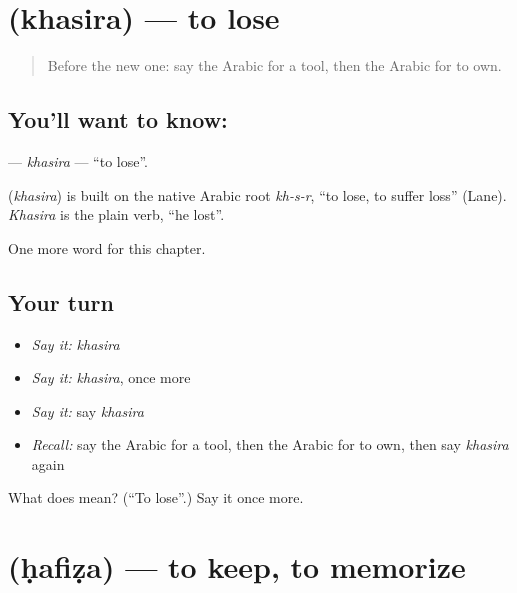 \section[\texorpdfstring{\ar{خسر} (khasira)}{خسر (khasira)}]{ (khasira) — to lose}

\label{lesson:AR-C110-khasira}



\begin{quote}
Before the new one: say the Arabic for a tool, then the Arabic for to own.
\end{quote}

\subsection*{You'll want to know: }
\textbf{} — \emph{khasira} — \textquotedblleft{}to lose\textquotedblright{}.

\begin{cousinweb}
\textbf{} (\emph{khasira}) is built on the native Arabic root \emph{kh-s-r}, \textquotedblleft{}to lose, to suffer loss\textquotedblright{} (Lane). \emph{Khasira} is the plain verb, \textquotedblleft{}he lost\textquotedblright{}.
\end{cousinweb}

\begin{grammarlens}[title={What you've built}]
One more word for this chapter.
\end{grammarlens}

\subsection*{Your turn}
\begin{itemize}
\raggedright
  \item \emph{Say it:} \emph{khasira}
  \item \emph{Say it:} \emph{khasira}, once more
  \item \emph{Say it:} say \emph{khasira}
  \item \emph{Recall:} say the Arabic for a tool, then the Arabic for to own, then say \emph{khasira} again
\end{itemize}

\begin{tcolorbox}[breakable,colback=teal!4,colframe=teal!35!black,title={Before you move on}]
What does  mean? (\textquotedblleft{}To lose\textquotedblright{}.) Say it once more.
\end{tcolorbox}
\section[\texorpdfstring{\ar{حفظ} (ḥafiẓa)}{حفظ (ḥafiẓa)}]{ (ḥafiẓa) — to keep, to memorize}

